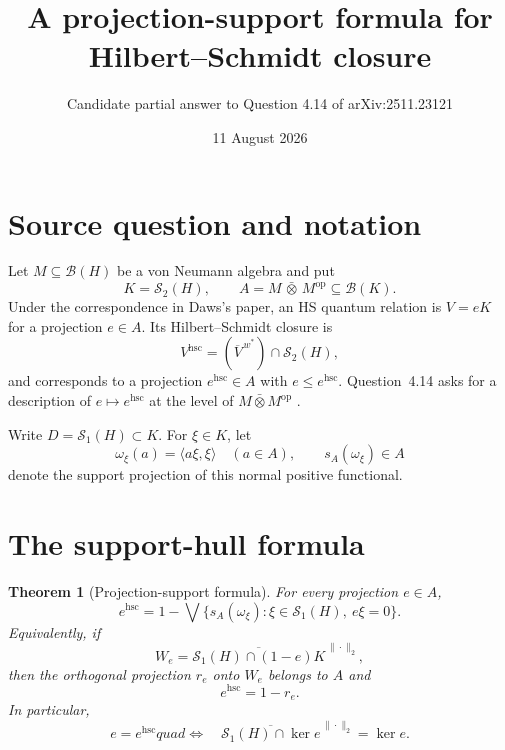 \documentclass[11pt]{article}
\title{A projection-support formula for Hilbert--Schmidt closure}
\author{Candidate partial answer to Question 4.14 of arXiv:2511.23121}
\date{11 August 2026}
\newtheorem{theorem}{Theorem}
\newcommand{\HS}{\mathcal S_2}
\newcommand{\TC}{\mathcal S_1}
\begin{document}
\maketitle

\noindent{}

\section{Source question and notation}

Let $M\subseteq\mathcal B(H)$ be a von Neumann algebra and put
\[
 K=\HS(H),\qquad A=M\,\bar\otimes\,M^{\mathrm{op}}\subseteq\mathcal B(K).
\]
Under the correspondence in Daws's paper, an HS quantum relation is
$V=eK$ for a projection $e\in A$.  Its Hilbert--Schmidt closure is
\[
 V^{\mathrm{hsc}}=(\overline V^{\,w^*})\cap\HS(H),
\]
and corresponds to a projection $e^{\mathrm{hsc}}\in A$ with
$e\leq e^{\mathrm{hsc}}$.  Question~4.14 asks for a description of
$e\mapsto e^{\mathrm{hsc}}$ at the level of
$M\bar\otimes M^{\mathrm{op}}$ \cite[Question~4.14]{Daws}.

Write $D=\TC(H)\subset K$.  For $\xi\in K$, let
\[
 \omega_\xi(a)=\langle a\xi,\xi\rangle\quad(a\in A),
 \qquad s_A(\omega_\xi)\in A
\]
denote the support projection of this normal positive functional.

\section{The support-hull formula}

\begin{theorem}[Projection-support formula]\label{thm:formula}
For every projection $e\in A$,
\begin{equation}\label{eq:main}
 e^{\mathrm{hsc}}
 =1-\bigvee\bigl\{s_A(\omega_\xi):
                 \xi\in\TC(H),\ e\xi=0\bigr\}.
\end{equation}
Equivalently, if
\[
 W_e=\overline{\TC(H)\cap(1-e)K}^{\,\|\cdot\|_2},
\]
then the orthogonal projection $r_e$ onto $W_e$ belongs to $A$ and
\begin{equation}\label{eq:re}
                  e^{\mathrm{hsc}}=1-r_e.
\end{equation}
In particular,
\begin{equation}\label{eq:fixed}
 e=e^{\mathrm{hsc}}quad\Longleftrightarrow\quad
 \overline{\TC(H)\cap\ker e}^{\,\|\cdot\|_2}=\ker e.
\end{equation}
\end{theorem}
\end{document}

